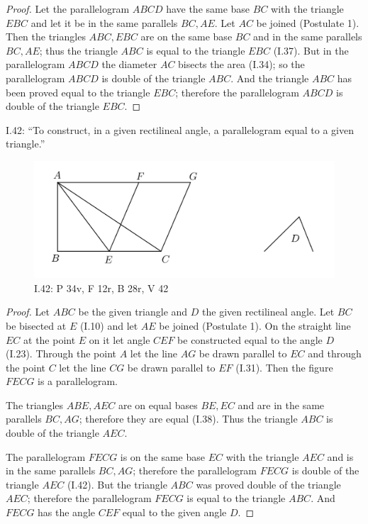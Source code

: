 \documentclass{article}
\begin{document}
\begin{proof}
Let the parallelogram $ABCD$ have the same base $BC$ with the triangle $EBC$ and let it be in
the same parallels $BC,AE$. Let $AC$ be joined (Postulate 1). Then the triangles
$ABC,EBC$ are on the same base $BC$ and in the same parallels $BC,AE$; thus 
the triangle $ABC$ is equal to the triangle $EBC$ (I.37).
But in the parallelogram $ABCD$ the diameter $AC$ bisects the area (I.34); so
the parallelogram $ABCD$ is double of the triangle $ABC$. 
And the triangle $ABC$ has been proved  equal to the triangle $EBC$;
therefore the parallelogram $ABCD$ is double of the triangle $EBC$.
\end{proof}

I.42: ``To construct, in a given rectilineal angle, a parallelogram
equal to a given triangle.''

\begin{figure}
\begin{center}
\includegraphics{I42.png}
\end{center}
\caption{I.42:  P 34v, F 12r, B 28r, V 42}
\label{I42}
\end{figure}

\begin{proof}
Let $ABC$ be the given triangle and $D$ the given rectilineal angle.
Let $BC$ be bisected at $E$ (I.10) and let $AE$ be joined (Postulate 1).
On the straight line $EC$ at the point $E$ on it let angle $CEF$ be constructed equal to the angle $D$ (I.23).
Through the point $A$ let the line $AG$ be drawn parallel to $EC$
and through the point $C$ let the line $CG$ be drawn parallel to $EF$ (I.31).
Then the figure $FECG$ is a parallelogram. 

The triangles $ABE,AEC$ are on equal bases $BE,EC$ and are in the same parallels $BC,AG$; therefore 
they are equal (I.38). Thus the triangle $ABC$ is double of the triangle $AEC$.

The parallelogram $FECG$ is on the same base $EC$ with the triangle $AEC$ and is in the same parallels $BC,AG$; therefore
the parallelogram $FECG$ is double of the triangle $AEC$ (I.42). But
the triangle $ABC$ was proved double of the triangle $AEC$; therefore the parallelogram $FECG$ is equal to the 
triangle $ABC$. 
And $FECG$ has the angle $CEF$ equal to the given angle $D$.
\end{proof}
\end{document}
